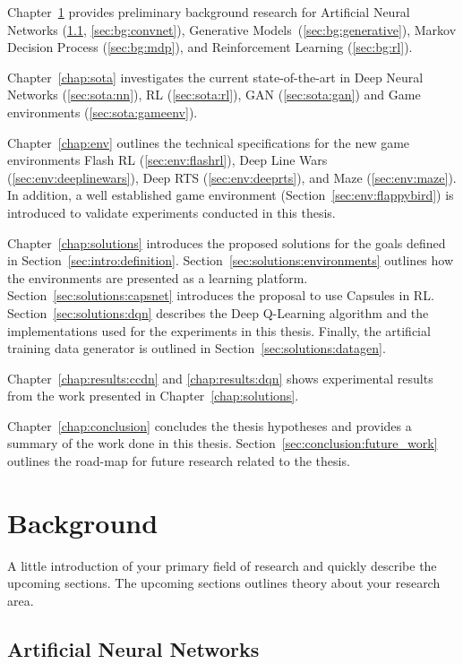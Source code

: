 \documentclass{uia}
\begin{document}
Chapter~\ref{chap:bg} provides preliminary background research for Artificial Neural Networks (\ref{sec:bg:ann}, \ref{sec:bg:convnet}), Generative Models~(\ref{sec:bg:generative}), Markov Decision Process (\ref{sec:bg:mdp}), and Reinforcement Learning (\ref{sec:bg:rl}).

Chapter~\ref{chap:sota} investigates the current state-of-the-art in Deep Neural Networks (\ref{sec:sota:nn}), \gls{RL} (\ref{sec:sota:rl}), \gls{GAN} (\ref{sec:sota:gan}) and Game environments (\ref{sec:sota:gameenv}).

Chapter~\ref{chap:env} outlines the technical specifications for the new game environments Flash RL (\ref{sec:env:flashrl}), Deep Line Wars (\ref{sec:env:deeplinewars}), Deep RTS (\ref{sec:env:deeprts}), and Maze (\ref{sec:env:maze}). In addition, a well established game environment (Section~\ref{sec:env:flappybird}) is introduced to validate experiments conducted in this thesis.

Chapter~\ref{chap:solutions} introduces the proposed solutions for the goals defined in Section~\ref{sec:intro:definition}. Section~\ref{sec:solutions:environments} outlines how the environments are presented as a learning platform. Section~\ref{sec:solutions:capsnet} introduces the proposal to use Capsules in \gls{RL}. Section~\ref{sec:solutions:dqn} describes the Deep Q-Learning algorithm and the implementations used for the experiments in this thesis. Finally, the artificial training data generator is outlined in Section~\ref{sec:solutions:datagen}.


Chapter~\ref{chap:results:ccdn} and \ref{chap:results:dqn} shows experimental results from the work presented in Chapter~\ref{chap:solutions}. 

Chapter~\ref{chap:conclusion} concludes the thesis hypotheses and provides a summary of the work done in this thesis. Section~\ref{sec:conclusion:future_work} outlines the road-map for future research related to the thesis.


\chapter{Background}
\label{chap:bg}
A little introduction of your primary field of research and quickly describe the upcoming sections.
The upcoming sections outlines theory about your research area.

\section{Artificial Neural Networks}
\label{sec:bg:ann}
\end{document}
